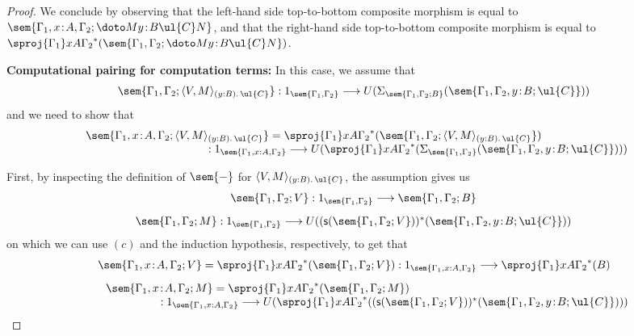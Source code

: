 \begin{proof}
We conclude by observing that the left-hand side top-to-bottom composite morphism is equal to  $\sem{\Gamma_1, x \!:\! A, \Gamma_2;\doto M {y \!:\! B} {\ul{C}} N}$, and that the right-hand side top-to-bottom composite morphism is equal to $\sproj {\Gamma_1} x A {\Gamma_2} ^* (\sem{\Gamma_1,\Gamma_2;\doto M {y \!:\! B} {\ul{C}} N})$. 

\vspace{0.2cm}
\noindent
\textbf{Computational pairing for computation terms:}
In this case, we assume that 
\[
\sem{\Gamma_1,\Gamma_2; \langle V , M \rangle_{(y : B).\, \ul{C}}} : 1_{\sem{\Gamma_1,\Gamma_2}} \longrightarrow U(\Sigma_{\sem{\Gamma_1,\Gamma_2;B}}(\sem{\Gamma_1,\Gamma_2, y \!:\! B ;\ul{C}}))
\]
and we need to show that
\[
\begin{array}{c}
\hspace{-2.5cm}
\sem{\Gamma_1, x \!:\! A,\Gamma_2; \langle V , M \rangle_{(y : B).\, \ul{C}}} = \sproj {\Gamma_1} x A {\Gamma_2}^*(\sem{\Gamma_1,\Gamma_2;\langle V , M \rangle_{(y : B).\, \ul{C}}}) 
\\
\hspace{4cm}
: 1_{\sem{\Gamma_1, x : A,\Gamma_2}} \longrightarrow U(\sproj {\Gamma_1} x A {\Gamma_2}^*(\Sigma_{\sem{\Gamma_1,\Gamma_2}}(\sem{\Gamma_1,\Gamma_2, y \!:\! B ;\ul{C}})))
\end{array}
\]

First, by inspecting the definition of $\sem{-}$ for $\langle V , M \rangle_{(y : B).\, \ul{C}}$, the assumption  gives us
\[
\begin{array}{c}
\sem{\Gamma_1,\Gamma_2;V} : 1_{\sem{\Gamma_1,\Gamma_2}} \longrightarrow \sem{\Gamma_1,\Gamma_2;B}
\\[3mm]
\sem{\Gamma_1,\Gamma_2;M} : 1_{\sem{\Gamma_1,\Gamma_2}} \longrightarrow U((\mathsf{s}(\sem{\Gamma_1,\Gamma_2;V}))^*(\sem{\Gamma_1,\Gamma_2, y \!:\! B ;\ul{C}}))
\end{array}
\]
on which we can use $(c)$ and the induction hypothesis, respectively, to get that
\[
\begin{array}{c}
\sem{\Gamma_1, x \!:\! A,\Gamma_2;V} = \sproj {\Gamma_1} x A {\Gamma_2}^*(\sem{\Gamma_1,\Gamma_2;V}) : 1_{\sem{\Gamma_1, x : A,\Gamma_2}} \longrightarrow \sproj {\Gamma_1} x A {\Gamma_2}^*(B)
\\[3mm]
\hspace{-6cm}
\sem{\Gamma_1, x \!:\! A,\Gamma_2;M} = \sproj {\Gamma_1} x A {\Gamma_2}^*(\sem{\Gamma_1,\Gamma_2;M})
\\
\hspace{2.5cm}
: 1_{\sem{\Gamma_1, x : A, \Gamma_2}} \longrightarrow U(\sproj {\Gamma_1} x A {\Gamma_2}^*((\mathsf{s}(\sem{\Gamma_1,\Gamma_2;V}))^*(\sem{\Gamma_1,\Gamma_2, y \!:\! B ;\ul{C}})))
\end{array}
\]


\end{proof}
